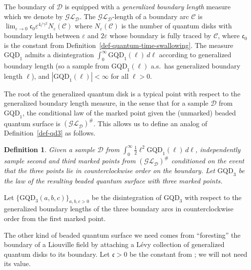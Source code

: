 \documentclass[a4paper]{article}
\numberwithin{equation}{section}
\def\eps{\varepsilon}
\newcommand{\cD}{\mathcal{D}}
\newcommand{\GQD}{\mathrm{GQD}}
\newtheorem{definition}[theorem]{Definition}
\theoremstyle{remark}
\numberwithin{equation}{section}
\begin{document}
The boundary of $\mathcal D$ is equipped with a \emph{generalized boundary length} measure which we denote by $\mathcal{GL}_{\mathcal D}$. The $\mathcal{GL}_{\mathcal D}$-length of a boundary arc $\mathcal C$ is $\lim_{\eps \to 0} \mathfrak c_0 \eps^{4/\gamma^2} N_\eps(\mathcal C)$ where $N_\eps(\mathcal C)$ is the number of quantum disks with boundary length between $\eps$ and $2\eps$ whose boundary is fully traced by $\mathcal C$, where $\mathfrak c_0$ is the constant from Definition~\ref{def-quantum-time-swallowing}. The measure $\GQD_1$ admits a disintegration $\int_0^\infty \GQD_1(\ell)\,d\ell$ according to generalized boundary length (so a sample from $\GQD_1(\ell)$ a.s.\ has generalized boundary length $\ell$), and $|\GQD_1(\ell)|<\infty$ for all $\ell>0$. 

The root of the generalized quantum disk is a typical point with respect to the generalized boundary length measure, in the sense that for a sample $\cD$ from $\GQD_1$, the conditional law of the marked point given the (unmarked) beaded quantum surface is $(\mathcal{GL}_{\mathcal D})^\#$. This allows us to define an analog of Definition~\ref{def-qd3} as follows.


\begin{definition}\label{def-forested-LF}
    Given a sample $\mathcal D$ from $\int_0^\infty \frac12 \ell^2 \GQD_1(\ell) \, d\ell$, independently sample second and third marked points from $(\mathcal{GL}_{\mathcal D})^\#$ conditioned on the event that the three points lie in counterclockwise order on the boundary. Let $\GQD_3$ be the law of the resulting beaded quantum surface with three marked points. 
\end{definition}
Let $\{\GQD_3(a,b,c)\}_{a,b,c >0}$ be the disintegration of $\GQD_3$ with respect to the generalized boundary lengths of the three boundary arcs in counterclockwise order from the first marked point. 

The other kind of beaded quantum surface we need comes from ``foresting'' the boundary of a Liouville field by attaching a L\'evy collection of generalized quantum disks to its boundary. Let $\mathfrak c > 0$ be the constant from \cite[Proposition 3.11]{ahsy-nonsimple}; we will not need its value.
\end{document}
